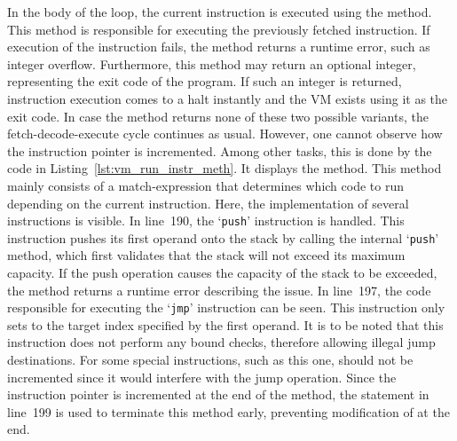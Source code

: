In the body of the loop, the current instruction is executed using the  method.
This method is responsible for executing the previously fetched instruction.
If execution of the instruction fails, the method returns a runtime error, such as integer overflow.
Furthermore, this method may return an optional integer, representing the exit code of the program.
If such an integer is returned, instruction execution comes to a halt instantly and the VM exists using it as the exit code.
In case the method returns none of these two possible variants, the fetch-decode-execute cycle continues as usual.
However, one cannot observe how the instruction pointer is incremented.
Among other tasks, this is done by the code in Listing~\ref{lst:vm_run_instr_meth}.%
%
%
It displays the  method.
This method mainly consists of a match-expression that determines which code to run depending on the current instruction.
Here, the implementation of several instructions is visible.
In line~190, the `\texttt{push}' instruction is handled.
This instruction pushes its first operand onto the stack by calling the internal `\texttt{push}' method, which first validates that the stack will not exceed its maximum capacity.
If the push operation causes the capacity of the stack to be exceeded, the method returns a runtime error describing the issue.
In line~197, the code responsible for executing the `\texttt{jmp}' instruction can be seen.
This instruction only sets  to the target index specified by the first operand.
It is to be noted that this instruction does not perform any bound checks, therefore allowing illegal jump destinations.
For some special instructions, such as this one,  should not be incremented since it would interfere with the jump operation.
Since the instruction pointer is incremented at the end of the method, the  statement in line~199 is used to terminate this method early, preventing modification of  at the end.

